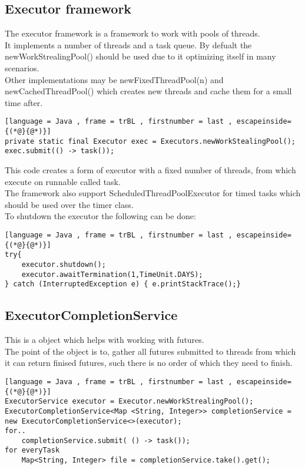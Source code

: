 \documentclass[12pt, a4paper]{article}
\begin{document}
		\subsection{Executor framework}
			The executor framework is a framework to work with pools of threads.\\
			It implements a number of threads and a task queue.
			By defualt the newWorkStrealingPool() should be used due to it optimizing itself in many scenarios.\\
			Other implementations may be newFixedThreadPool(n) and newCachedThreadPool() which creates new threads and cache them for a small time after.\\
	\begin{lstlisting}[language = Java , frame = trBL , firstnumber = last , escapeinside={(*@}{@*)}]
private static final Executor exec = Executors.newWorkStealingPool();
exec.submit(() -> task());
\end{lstlisting}
			This code creates a form of executor with a fixed number of threads, from which execute on runnable called task.\\
			The framework also support ScheduledThreadPoolExecutor for timed tasks which should be used over the timer class.\\
			To shutdown the executor the following can be done:
	\begin{lstlisting}[language = Java , frame = trBL , firstnumber = last , escapeinside={(*@}{@*)}]
try{
	executor.shutdown();
	executor.awaitTermination(1,TimeUnit.DAYS);
} catch (InterruptedException e) { e.printStackTrace();}
			\end{lstlisting}
		\subsection{ExecutorCompletionService}
			This is a object which helps with working with futures.\\
			The point of the object is to, gather all futures submitted to threads from which it can return finised futures, such there is no order of which they need to finish.\\
			
	\begin{lstlisting}[language = Java , frame = trBL , firstnumber = last , escapeinside={(*@}{@*)}]
ExecutorService executor = Executor.newWorkStrealingPool();
ExecutorCompletionService<Map <String, Integer>> completionService = new ExecutorCompletionService<>(executor);
for..
	completionService.submit( () -> task());
for everyTask
	Map<String, Integer> file = completionService.take().get();
			\end{lstlisting}
\end{document}
